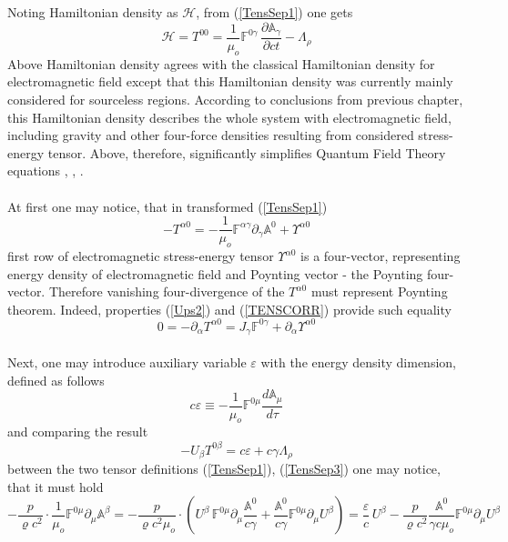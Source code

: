 \documentclass[aps,prx,preprint,groupedaddress,showkeys]{revtex4-2}
\newcommand{\mds}[1] {\frac{d {#1}}{d\tau}}
\begin{document}
Noting Hamiltonian density as $\mathcal{H}$, from (\ref{TensSep1}) one gets
\begin{equation} \label{HQ2}
\mathcal{H} =  T^{0 0} = \frac{1}{\mu_o} \mathbb{F}^{0 \gamma} \, \frac{\partial \mathbb{A}_{\gamma}}{\partial ct} - \Lambda_{\rho}
\end{equation}
Above Hamiltonian density agrees with the classical Hamiltonian density for electromagnetic field \cite{LDEM} except that this Hamiltonian density was currently mainly considered for sourceless regions. According to conclusions from previous chapter, this Hamiltonian density describes the whole system with electromagnetic field, including gravity and other four-force densities resulting from considered stress-energy tensor. Above, therefore, significantly simplifies Quantum Field Theory equations  \cite{QFT1}, \cite{QFT2}, \cite{QFT3}.\\
~\\
At first one may notice, that in transformed (\ref{TensSep1})
\begin{equation} \label{HQ4}
- T^{\alpha 0} =  - \frac{1}{\mu_o} \mathbb{F}^{\alpha \gamma} \partial_{\gamma} \mathbb{A}^{0} + \Upsilon^{\alpha 0}
\end{equation}
first row of electromagnetic stress-energy tensor $\Upsilon^{\alpha 0}$ is a four-vector, representing energy density of electromagnetic field and Poynting vector \cite{PoV} - the Poynting four-vector. Therefore vanishing four-divergence of the $T^{\alpha 0}$ must represent Poynting theorem. Indeed, properties (\ref{Ups2}) and (\ref{TENSCORR}) provide such equality
\begin{equation} \label{HQ5}
0 = - \partial_{\alpha} T^{\alpha 0} = J_{\gamma} \mathbb{F}^{0 \gamma} + \partial_{\alpha} \Upsilon^{\alpha 0} 
\end{equation}
~\\
Next, one may introduce auxiliary variable $\varepsilon$ with the energy density dimension, defined as follows
\begin{equation} \label{EpsDef}
c\varepsilon \equiv - \frac{1}{\mu_o} \mathbb{F}^{0 \mu} \mds {\mathbb{A}_{\mu}}
\end{equation}
and comparing the result
\begin{equation} \label{Lagr}
- U_{\beta}T^{0 \beta} = c\varepsilon + c\gamma \Lambda_{\rho}
\end{equation}
between the two tensor definitions (\ref{TensSep1}), (\ref{TensSep3}) one may notice, that it must hold
\begin{equation} \label{EpsProp}
- \frac{p}{\varrho c^2} \cdot \frac{1}{\mu_o} \mathbb{F}^{0 \mu} \partial_{\mu} \mathbb{A}^{\beta} = - \frac{p}{\varrho c^2 \mu_o} \cdot \left ( U^{\beta} \, \mathbb{F}^{0 \mu} \partial_{\mu} \frac{\mathbb{A}^0}{c\gamma} + \frac{\mathbb{A}^0}{c\gamma} \mathbb{F}^{0 \mu} \partial_{\mu} U^{\beta} \right )  = \frac{\varepsilon}{c} \, U^{\beta} - \frac{p}{\varrho c^2} \frac{\mathbb{A}^0}{\gamma c\mu_o} \mathbb{F}^{0 \mu} \partial_{\mu} U^{\beta}
\end{equation}
\end{document}
